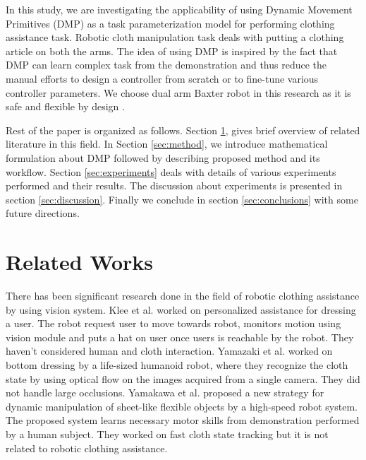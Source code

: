 \documentclass[sigconf]{acmart}
\begin{document}
In this study, we are investigating the applicability of using Dynamic Movement Primitives (DMP) as a task parameterization model for performing clothing assistance task. Robotic cloth manipulation task deals with putting a clothing article on both the arms. The idea of using DMP is inspired by the fact that DMP can learn complex task from the demonstration \cite{ijspeert2003learning, schaal2006dynamic, ijspeert2013dynamical} and thus reduce the manual efforts to design a controller from scratch or to fine-tune various controller parameters. We choose dual arm Baxter robot in this research as it is safe and flexible by design \cite{fitzgerald2013developing}.

Rest of the paper is organized as follows. Section \ref{sec:related_works}, gives brief overview of related literature in this field. In Section \ref{sec:method}, we introduce mathematical formulation about DMP followed by describing proposed method and its workflow. Section \ref{sec:experiments} deals with details of various experiments performed and their results. The discussion about experiments is presented in section \ref{sec:discussion}. Finally we conclude in section \ref{sec:conclusions} with some future directions.

\section{Related Works}
\label{sec:related_works}
There has been significant research done in the field of robotic clothing assistance by using vision system. Klee et al. \cite{klee2015personalized} worked on personalized assistance for dressing a user. The robot request user to move towards robot, monitors motion using vision module and puts a hat on user once users is reachable by the robot. They haven't considered human and cloth interaction. Yamazaki et al. \cite{yamazaki2013method, yamazaki2014bottom}  worked on bottom dressing by a life-sized humanoid robot, where they recognize the cloth state by using optical flow on the images acquired from a single camera. They did not handle large occlusions. Yamakawa et al. \cite{yamakawa2011dynamic} proposed a new strategy for dynamic manipulation of sheet-like flexible objects by a high-speed robot system. The proposed system learns necessary motor skills from demonstration performed by a human subject. They worked on fast cloth state tracking but it is not related to robotic clothing assistance.
\end{document}
